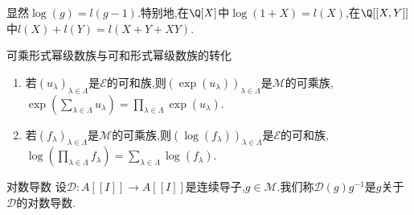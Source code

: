 \begin{remark}{}{}
	显然$\log\left(g\right)=l\left(g-1\right)$.特别地,在$\Q[X]$中$\log\left(1+X\right)=l\left(X\right)$,在$\Q[[X,Y]]$中$l\left(X\right)+l\left(Y\right)=l\left(X+Y+XY\right)$.
\end{remark}

\begin{proposition}{可乘形式幂级数族与可和形式幂级数族的转化}{}
	\begin{enumerate}
		\item 若$\left(u_{\lambda}\right)_{\lambda\in\Lambda}$是$\mathscr{E}$的可和族,则$\left(\exp\left(u_{\lambda}\right)\right)_{\lambda\in\Lambda}$是$\mathscr{M}$的可乘族,$\exp\left(\sum\limits_{\lambda\in\Lambda}u_{\lambda}\right)=\prod\limits_{\lambda\in\Lambda}\exp\left(u_{\lambda}\right)$.
		\item 若$\left(f_{\lambda}\right)_{\lambda\in\Lambda}$是$\mathscr{M}$的可乘族,则$\left(\log\left(f_{\lambda}\right)\right)_{\lambda\in\Lambda}$是$\mathscr{E}$的可和族,$\log\left(\prod\limits_{\lambda\in\Lambda}f_{\lambda}\right)=\sum\limits_{\lambda\in\Lambda}\log\left(f_{\lambda}\right)$.
	\end{enumerate}
\end{proposition}

\begin{definition}{对数导数}{}
	设$\mathcal{D}:A[[I]]\to A[[I]]$是连续导子,$g\in\mathcal{M}$.我们称$\mathcal{D}\left(g\right)g^{-1}$是$g$关于$\mathcal{D}$的对数导数.
\end{definition}







































